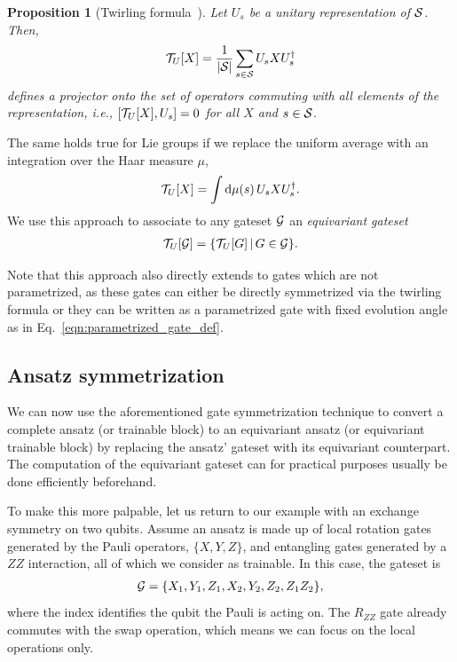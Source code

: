\documentclass[a4paper,twocolumn,notitlepage,nofootinbib,superscriptaddress,floatfix]{revtex4-2}
\newtheorem{proposition}[theorem]{Proposition}
\begin{document}
\begin{proposition}[Twirling formula~\cite{helsennodatequantum}]
Let $U_s$ be a unitary representation of $\mathcal{S}$. Then, 
\begin{align}
    \mathcal{T}_U[X] = \frac{1}{|\mathcal{S}|} \sum_{s \in \mathcal{S}} U_s X U_s^{\dagger}
\end{align}
defines a projector onto the set of operators commuting with all elements of the representation, i.e., $[\mathcal{T}_U[X], U_s] = 0$ for all $X$ and $s \in \mathcal{S}$.
\end{proposition}
The same holds true for Lie groups if we replace the uniform average with an integration over the Haar measure $\mu$,
\begin{align}
    \mathcal{T}_U[X] = \int \mathrm{d} \mu(s) \, U_s X U_s^{\dagger}.
\end{align}
We use this approach to associate to any gateset $\mathcal{G}$ an \emph{equivariant gateset}
\begin{align}\label{eqn:def_equivariant_gateset}
    \mathcal{T}_U[\mathcal{G}] = \{ \mathcal{T}_U[G] \, | \, G \in \mathcal{G} \}.
\end{align}

Note that this approach also directly extends to gates which are not parametrized, as these gates can either be directly symmetrized via the twirling formula or they can be written as a parametrized gate with fixed evolution angle as in Eq.~\eqref{eqn:parametrized_gate_def}.

\subsection*{Ansatz symmetrization}

We can now use the aforementioned gate symmetrization technique to convert a complete ansatz (or trainable block) to an equivariant ansatz (or equivariant trainable block) by replacing the ansatz' gateset with its equivariant counterpart. The computation of the equivariant gateset can for practical purposes usually be done efficiently beforehand.

To make this more palpable, let us return to our example with an exchange symmetry on two qubits. Assume an ansatz is made up of local rotation gates generated by the Pauli operators, $\{X ,Y,Z\}$, and entangling gates generated by a $ZZ$ interaction, all of which we consider as trainable. In this case, the gateset is
\begin{align}
    \mathcal{G} = \{X_1, Y_1, Z_1, X_2, Y_2, Z_2, Z_1 Z_2\},
\end{align}
where the index identifies the qubit the Pauli is acting on. 
The $R_{ZZ}$ gate already commutes with the swap operation, which means we can focus on the local operations only. 
\end{document}

